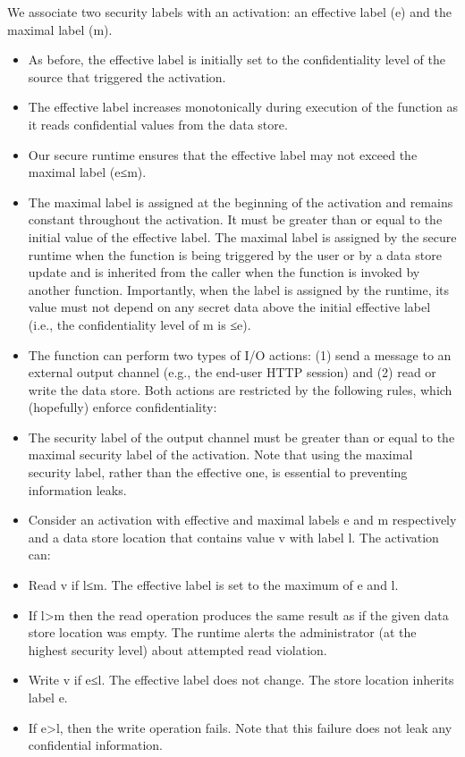 We associate two security labels with an activation: an effective label (e) and the maximal label (m).
\begin{itemize}
    \item As before, the effective label is initially set to the confidentiality level of the source that triggered the activation.

    \item The effective label increases monotonically during execution of the function as it reads confidential values from the data store.

    \item Our secure runtime ensures that the effective label may not exceed the maximal label (e≤m).

    \item The maximal label is assigned at the beginning of the activation and remains constant throughout the activation. It must be greater than or equal to the initial value of the effective label. The maximal label is assigned by the secure runtime when the function is being triggered by the user or by a data store update and is inherited from the caller when the function is invoked by another function. Importantly, when the label is assigned by the runtime, its value must not depend on any secret data above the initial effective label (i.e., the confidentiality level of m is ≤e).

    \item The function can perform two types of I/O actions: (1) send a message to an external output channel (e.g., the end-user HTTP session) and (2) read or write the data store. Both actions are restricted by the following rules, which (hopefully) enforce confidentiality:

    \item The security label of the output channel must be greater than or equal to the maximal security label of the activation. Note that using the maximal security label, rather than the effective one, is essential to preventing information leaks.

    \item Consider an activation with effective and maximal labels e and m respectively and a data store location that contains value v with label l. The activation can:

    \item Read v if l≤m. The effective label is set to the maximum of e and l.

    \item If l>m then the read operation produces the same result as if the given data store location was empty. The runtime alerts the administrator (at the highest security level) about attempted read violation.

    \item Write v if e≤l. The effective label does not change. The store location inherits label e.

    \item If e>l, then the write operation fails. Note that this failure does not leak any confidential information.
\end{itemize}

